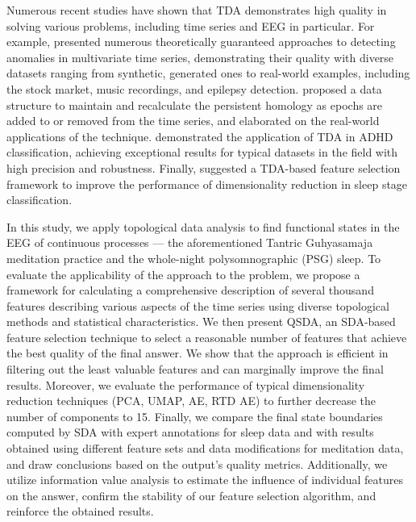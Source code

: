 \documentclass[journal,twoside,web]{ieeecolor2}
\begin{document}
Numerous recent studies have shown that TDA demonstrates high quality in solving various problems, including time series and EEG in particular. For example, \cite{chazal2024topologicalanalysisdetectinganomalies,rai2024identifyingextremeeventsstock,heo2024persistenthomologyfeaturedtime,chrétien2024timetopologicalanalysiseeg} presented numerous theoretically guaranteed approaches to detecting anomalies in multivariate time series, demonstrating their quality with diverse datasets ranging from synthetic, generated ones to real-world examples, including the stock market, music recordings, and epilepsy detection. \cite{dimontesano2024dynamicallymaintainingpersistenthomology} proposed a data structure to maintain and recalculate the persistent homology as epochs are added to or removed from the time series, and \cite{ost2024bananatreespersistencetime} elaborated on the real-world applications of the technique.  \cite{cai2024topologicalfeaturesearchmethod} demonstrated the application of TDA in ADHD classification, achieving exceptional results for typical datasets in the field with high precision and robustness. Finally, \cite{deng2024twostagehierarchicalexplainablefeature} suggested a TDA-based feature selection framework to improve the performance of dimensionality reduction in sleep stage classification.

In this study, we apply topological data analysis to find functional states in the EEG of continuous processes --- the aforementioned Tantric Guhyasamaja meditation practice and the whole-night polysomnographic (PSG) sleep. To evaluate the applicability of the approach to the problem, we propose a framework for calculating a comprehensive description of several thousand features describing various aspects of the time series using diverse topological methods and statistical characteristics. We then present QSDA, an SDA-based feature selection technique to select a reasonable number of features that achieve the best quality of the final answer. We show that the approach is efficient in filtering out the least valuable features and can marginally improve the final results. Moreover, we evaluate the performance of typical dimensionality reduction techniques (PCA, UMAP, AE, RTD AE) to further decrease the number of components to 15. Finally, we compare the final state boundaries computed by SDA with expert annotations for sleep data and with results obtained using different feature sets and data modifications for meditation data, and draw conclusions based on the output's quality metrics. Additionally, we utilize information value analysis to estimate the influence of individual features on the answer, confirm the stability of our feature selection algorithm, and reinforce the obtained results.
\end{document}
